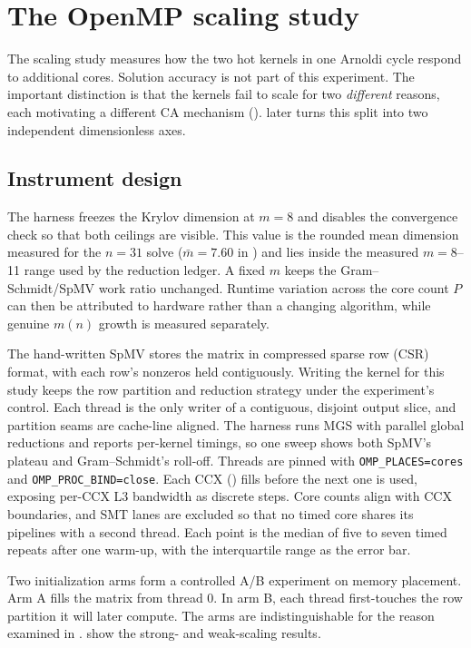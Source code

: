 \section{The OpenMP scaling study}\label{sec:scaling}

The scaling study measures how the two hot kernels in one Arnoldi cycle respond to additional cores. Solution accuracy is not part of this experiment. The important distinction is that the kernels fail to scale for two \emph{different} reasons, each motivating a different CA mechanism ().  later turns this split into two independent dimensionless axes.

\subsection{Instrument design}

The harness freezes the Krylov dimension at $m=8$ and disables the convergence check so that both ceilings are visible. This value is the rounded mean dimension measured for the $n=31$ solve ($\bar m=7.60$ in ) and lies inside the measured $m=8$--11 range used by the reduction ledger. A fixed $m$ keeps the Gram--Schmidt/SpMV work ratio unchanged. Runtime variation across the core count $P$ can then be attributed to hardware rather than a changing algorithm, while genuine $m(n)$ growth is measured separately.

The hand-written SpMV stores the matrix in compressed sparse row (CSR) format, with each row's nonzeros held contiguously. Writing the kernel for this study keeps the row partition and reduction strategy under the experiment's control. Each thread is the only writer of a contiguous, disjoint output slice, and partition seams are cache-line aligned. The harness runs MGS with parallel global reductions and reports per-kernel timings, so one sweep shows both SpMV's plateau and Gram--Schmidt's roll-off. Threads are pinned with \texttt{OMP\_PLACES=cores} and \texttt{OMP\_PROC\_BIND=close}. Each CCX () fills before the next one is used, exposing per-CCX L3 bandwidth as discrete steps. Core counts align with CCX boundaries, and SMT lanes are excluded so that no timed core shares its pipelines with a second thread. Each point is the median of five to seven timed repeats after one warm-up, with the interquartile range as the error bar.

Two initialization arms form a controlled A/B experiment on memory placement. Arm A fills the matrix from thread 0. In arm B, each thread first-touches the row partition it will later compute. The arms are indistinguishable for the reason examined in .  show the strong- and weak-scaling results.

